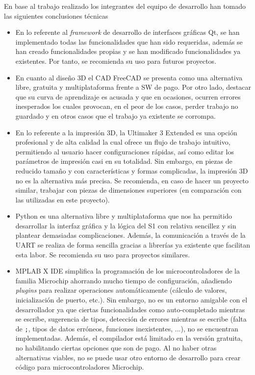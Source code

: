 En base al trabajo realizado los integrantes del equipo de desarrollo han tomado las siguientes conclusiones técnicas 

\begin{itemize}

    \item En lo referente al \textit{framework} de desarrollo de interfaces gráficas Qt, se han implementado todas las funcionalidades que han sido  requeridas, además se han creado funcionalidades propias y se han modificado funcionalidades ya existentes. Por tanto, se recomienda su uso para futuros proyectos.
    \item En cuanto al diseño 3D el CAD FreeCAD se presenta como una alternativa libre, gratuita y multiplataforma frente a \ac{SW} de pago. Por otro lado, destacar que su curva de aprendizaje es acusada y que en ocasiones, ocurren errores inesperados los cuales provocan, en el peor de los casos, perder trabajo no guardado y en otros casos que el trabajo ya existente se corrompa.
    \item En lo referente a la impresión 3D, la Ultimaker 3 Extended es una opción profesional y de alta calidad la cual ofrece un flujo de trabajo intuitivo, permitiendo al usuario hacer configuraciones rápidas, así como editar los parámetros de impresión casi en su totalidad. Sin embargo, en piezas de reducido tamaño y con características y formas complicadas, la impresión 3D no es la alternativa más precisa. Se recomienda, en caso de hacer un proyecto similar, trabajar con piezas de dimensiones superiores (en comparación con las utilizadas en este proyecto).
    \item Python es una alternativa libre y multiplataforma que nos ha permitido desarrollar la interfaz gráfica y la lógica del \ac{S1} con relativa sencillez y sin plantear demasiadas complicaciones. Además, la comunicación a través de la UART se realiza de forma sencilla gracias a librerías ya existente que facilitan esta labor. Se recomienda su uso para proyectos similares.
    \item MPLAB X IDE simplifica la programación de los microcontroladores de la familia Microchip ahorrando mucho tiempo de configuración, añadiendo \textit{plugins} para realizar operaciones automáticamente (cálculo de valores, inicialización de puerto, etc.). Sin embargo, no es un entorno amigable con el desarrollador ya que ciertas funcionalidades como auto-completado mientras se escribe, sugerencia de tipos, detección de errores mientras se escribe (falta de \texttt{;}, tipos de datos erróneos, funciones inexistentes, ...), no se encuentran implementadas. Además, el compilador está limitado en la versión gratuita, no habilitando ciertas opciones que son de pago. Al no haber otras alternativas viables, no se puede usar otro entorno de desarrollo para crear código para microcontroladores Microchip.

\end{itemize}
